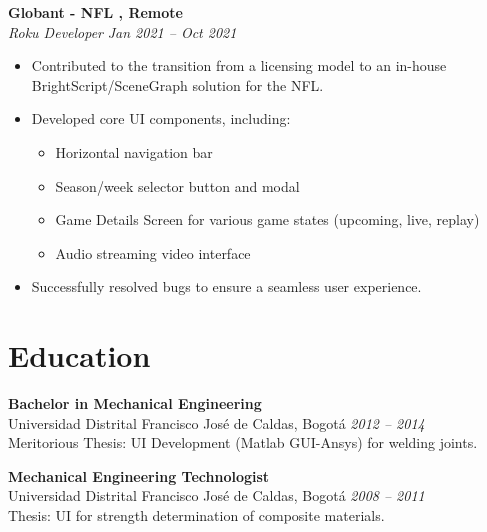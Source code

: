 \documentclass[11pt,a4paper]{article}
\newlength{\jobspacing}
\begin{document}
\vspace{\jobspacing}

\textbf{Globant - NFL , Remote} \\
\emph{Roku Developer} \hfill \textit{Jan 2021 -- Oct 2021} \\
\begin{itemize}[leftmargin=*]
    \item Contributed to the transition from a licensing model to an in-house BrightScript/SceneGraph solution for the NFL.
    \item Developed core UI components, including:
    \begin{itemize}[leftmargin=*]
        \item Horizontal navigation bar
        \item Season/week selector button and modal
        \item Game Details Screen for various game states (upcoming, live, replay)
        \item Audio streaming video interface
    \end{itemize}
    \item Successfully resolved bugs to ensure a seamless user experience.
\end{itemize}

\section*{Education}
\textbf{Bachelor in Mechanical Engineering} \\
Universidad Distrital Francisco José de Caldas, Bogotá \hfill \textit{2012 -- 2014} \\
Meritorious Thesis: UI Development (Matlab GUI-Ansys) for welding joints.

\textbf{Mechanical Engineering Technologist} \\
Universidad Distrital Francisco José de Caldas, Bogotá \hfill \textit{2008 -- 2011} \\
Thesis: UI for strength determination of composite materials.
\end{document}
